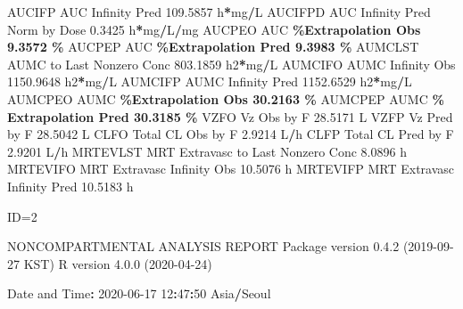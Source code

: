 \documentclass[
  12pt,
]{krantz}
\newenvironment{Shaded}{\begin{snugshade}}{\end{snugshade}}
\newcommand{\DecValTok}[1]{\textcolor[rgb]{0.00,0.00,0.81}{#1}}
\newcommand{\FloatTok}[1]{\textcolor[rgb]{0.00,0.00,0.81}{#1}}
\newcommand{\NormalTok}[1]{#1}
\newcommand{\OperatorTok}[1]{\textcolor[rgb]{0.81,0.36,0.00}{\textbf{#1}}}
\newcommand{\StringTok}[1]{\textcolor[rgb]{0.31,0.60,0.02}{#1}}
\begin{document}
\begin{Shaded}
\begin{Highlighting}[]
\NormalTok{AUCIFP     AUC Infinity Pred                             }\FloatTok{109.5857}\NormalTok{ h}\OperatorTok{*}\NormalTok{mg}\OperatorTok{/}\NormalTok{L}
\NormalTok{AUCIFPD    AUC Infinity Pred Norm by Dose                  }\FloatTok{0.3425}\NormalTok{ h}\OperatorTok{*}\NormalTok{mg}\OperatorTok{/}\NormalTok{L}\OperatorTok{/}\NormalTok{mg}
\NormalTok{AUCPEO     AUC }\OperatorTok{\%Extrapolation Obs                          9.3572 \%}
\NormalTok{AUCPEP     AUC }\OperatorTok{\%Extrapolation Pred                         9.3983 \%}
\NormalTok{AUMCLST    AUMC to Last Nonzero Conc                     }\FloatTok{803.1859}\NormalTok{ h2}\OperatorTok{*}\NormalTok{mg}\OperatorTok{/}\NormalTok{L}
\NormalTok{AUMCIFO    AUMC Infinity Obs                            }\FloatTok{1150.9648}\NormalTok{ h2}\OperatorTok{*}\NormalTok{mg}\OperatorTok{/}\NormalTok{L}
\NormalTok{AUMCIFP    AUMC Infinity Pred                           }\FloatTok{1152.6529}\NormalTok{ h2}\OperatorTok{*}\NormalTok{mg}\OperatorTok{/}\NormalTok{L}
\NormalTok{AUMCPEO    AUMC }\OperatorTok{\%Extrapolation Obs                        30.2163 \%}
\NormalTok{AUMCPEP    AUMC }\OperatorTok{\% Extrapolation Pred                      30.3185 \%}
\NormalTok{VZFO       Vz Obs by F                                    }\FloatTok{28.5171}\NormalTok{ L}
\NormalTok{VZFP       Vz Pred by F                                   }\FloatTok{28.5042}\NormalTok{ L}
\NormalTok{CLFO       Total CL Obs by F                               }\FloatTok{2.9214}\NormalTok{ L}\OperatorTok{/}\NormalTok{h}
\NormalTok{CLFP       Total CL Pred by F                              }\FloatTok{2.9201}\NormalTok{ L}\OperatorTok{/}\NormalTok{h}
\NormalTok{MRTEVLST   MRT Extravasc to Last Nonzero Conc              }\FloatTok{8.0896}\NormalTok{ h}
\NormalTok{MRTEVIFO   MRT Extravasc Infinity Obs                     }\FloatTok{10.5076}\NormalTok{ h}
\NormalTok{MRTEVIFP   MRT Extravasc Infinity Pred                    }\FloatTok{10.5183}\NormalTok{ h}





\NormalTok{ID=}\DecValTok{2}

\NormalTok{                        NONCOMPARTMENTAL ANALYSIS REPORT}
\NormalTok{                       Package version }\DecValTok{0}\NormalTok{.}\FloatTok{4.2}\NormalTok{ (}\DecValTok{2019{-}09{-}27}\NormalTok{ KST)}
\NormalTok{                          R version }\DecValTok{4}\NormalTok{.}\FloatTok{0.0}\NormalTok{ (}\DecValTok{2020{-}04{-}24}\NormalTok{)}

\NormalTok{Date and Time}\OperatorTok{:}\StringTok{ }\DecValTok{2020{-}06{-}17} \DecValTok{12}\OperatorTok{:}\DecValTok{47}\OperatorTok{:}\DecValTok{50}\NormalTok{ Asia}\OperatorTok{/}\NormalTok{Seoul}


\end{Highlighting}
\end{Shaded}
\end{document}

